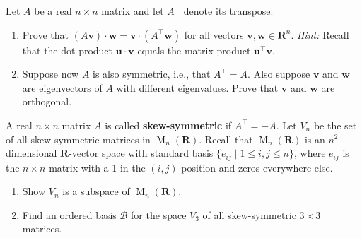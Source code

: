 \documentclass[11pt,twoside,openany]{memoir}
\begin{document}
        \begin{exercise}
        Let $A$ be a real $n \times n$ matrix and let $A^\top$ denote its transpose.
        \begin{enumerate}[label = (\arabic*)]
            \item Prove that $(A \mathbf{v}) \cdot \mathbf{w} = \mathbf{v} \cdot (A^\top \mathbf{w})$ for all vectors $\mathbf{v}, \mathbf{w} \in \mathbf{R}^n$. \textit{Hint:} Recall that the dot product $\mathbf{u} \cdot \mathbf{v}$ equals the matrix product $\mathbf{u}^\top \mathbf{v}$.
            \item Suppose now $A$ is also symmetric, i.e., that $A^\top = A$. Also suppose $\mathbf{v}$ and $\mathbf{w}$ are eigenvectors of $A$ with different eigenvalues. Prove that $\mathbf{v}$ and $\mathbf{w}$ are orthogonal.
        \end{enumerate}
        \end{exercise}
        
        \begin{exercise}
        A real $n \times n$ matrix $A$ is called \textbf{skew-symmetric} if $A^\top = -A$. Let $V_n$ be the set of all skew-symmetric matrices in $\operatorname{M}_n(\mathbf{R})$. Recall that $\operatorname{M}_n(\mathbf{R})$ is an $n^2$-dimensional $\mathbf{R}$-vector space with standard basis $\{ e_{ij} \mid 1 \le i,j \le n\}$, where $e_{ij}$ is the $n \times n$ matrix with a 1 in the $(i,j)$-position and zeros everywhere else.
        \begin{enumerate}[label = (\arabic*)]
            \item Show $V_n$ is a subspace of $\operatorname{M}_n(\mathbf{R})$.
            \item Find an ordered basis $\mathcal{B}$ for the space $V_3$ of all skew-symmetric $3 \times 3$ matrices.
        \end{enumerate}
        \end{exercise}

\newpage
\end{document}
